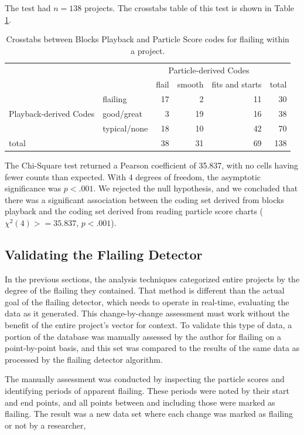 The test had $n=138$ projects. The crosstabs table of this test is shown in Table \ref{tab:crosstab-blocks-particle}.
\begin{table}
\begin{centering}
	\begin{tabular}{l l r r r | r}
			&& \multicolumn{3}{c}{Particle-derived Codes} 	\\
			&	& flail 	& smooth 	& fits and starts 	& total	\\ \hline
	\multirow{3}{*}{Playback-derived Codes}
	& flailing 		& 17	& 2			& 11		& 30	\\
	& good/great	& 3		& 19		& 16		& 38	\\
	& typical/none	& 18	& 10		& 42		& 70	\\ \hline
	total	&  		& 38	& 31		& 69		& 138
	\end{tabular}
	\caption[Flailing crosstabs between Blocks Playback and Particle Scores]{Crosstabs between Blocks Playback and Particle Score codes for flailing within a project.}
	\label{tab:crosstab-blocks-particle}
\end{centering}
\end{table}

The Chi-Square test returned a Pearson coefficient of 35.837, with no cells having fewer counts than expected. With 4 degrees of freedom, the asymptotic significance was $p<.001$. We rejected the null hypothesis, and we concluded that there was a significant association between the coding set derived from blocks playback and the coding set derived from reading particle score charts ($\chi^2(4)> = 35.837$, $p < .001$). 


\subsection{Validating the Flailing Detector}
\label{sec:validation-flailing-detector}
In the previous sections, the analysis techniques categorized entire projects by the degree of the flailing they contained. That method is different than the actual goal of the flailing detector, which needs to operate in real-time, evaluating the data as it generated. This change-by-change assessment must work without the benefit of the entire project's vector for context. To validate this type of data, a portion of the database was manually assessed by the author for flailing on a point-by-point basis, and this set was compared to the results of the same data as processed by the flailing detector algorithm. 

The manually assessment was conducted by inspecting the particle scores and identifying periods of apparent flailing. These periods were noted by their start and end points, and all points between and including those were marked as flailing. The result was a new data set where each change was marked as flailing or not by a researcher, 

